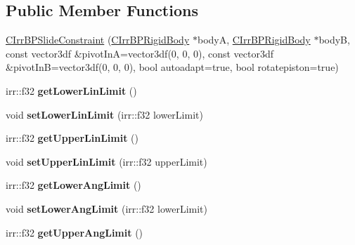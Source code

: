 \subsection*{Public Member Functions}
\begin{DoxyCompactItemize}
\item 
\hyperlink{class_c_irr_b_p_slide_constraint_a4912466dafa0ed9f93907498b2bd3866}{CIrrBPSlideConstraint} (\hyperlink{class_c_irr_b_p_rigid_body}{CIrrBPRigidBody} $\ast$bodyA, \hyperlink{class_c_irr_b_p_rigid_body}{CIrrBPRigidBody} $\ast$bodyB, const vector3df \&pivotInA=vector3df(0, 0, 0), const vector3df \&pivotInB=vector3df(0, 0, 0), bool autoadapt=true, bool rotatepiston=true)
\item 
\hypertarget{class_c_irr_b_p_slide_constraint_a8af14b26091df650f28ff8f2d53e372f}{
irr::f32 {\bfseries getLowerLinLimit} ()}
\label{class_c_irr_b_p_slide_constraint_a8af14b26091df650f28ff8f2d53e372f}

\item 
\hypertarget{class_c_irr_b_p_slide_constraint_aa0d2b6ed2de89734bf91613c5dac90cb}{
void {\bfseries setLowerLinLimit} (irr::f32 lowerLimit)}
\label{class_c_irr_b_p_slide_constraint_aa0d2b6ed2de89734bf91613c5dac90cb}

\item 
\hypertarget{class_c_irr_b_p_slide_constraint_adbfda3683804e88ab93581017f4e565c}{
irr::f32 {\bfseries getUpperLinLimit} ()}
\label{class_c_irr_b_p_slide_constraint_adbfda3683804e88ab93581017f4e565c}

\item 
\hypertarget{class_c_irr_b_p_slide_constraint_a49fea36c98c957f91feb695053d730fb}{
void {\bfseries setUpperLinLimit} (irr::f32 upperLimit)}
\label{class_c_irr_b_p_slide_constraint_a49fea36c98c957f91feb695053d730fb}

\item 
\hypertarget{class_c_irr_b_p_slide_constraint_afc55508bd7ebdf3ae2ef3fe8493b21cd}{
irr::f32 {\bfseries getLowerAngLimit} ()}
\label{class_c_irr_b_p_slide_constraint_afc55508bd7ebdf3ae2ef3fe8493b21cd}

\item 
\hypertarget{class_c_irr_b_p_slide_constraint_a52210fc1232fc9b0bdbc2c4189d3f637}{
void {\bfseries setLowerAngLimit} (irr::f32 lowerLimit)}
\label{class_c_irr_b_p_slide_constraint_a52210fc1232fc9b0bdbc2c4189d3f637}

\item 
\hypertarget{class_c_irr_b_p_slide_constraint_a161828edc475d822945e386b41236511}{
irr::f32 {\bfseries getUpperAngLimit} ()}
\label{class_c_irr_b_p_slide_constraint_a161828edc475d822945e386b41236511}


\end{DoxyCompactItemize}
